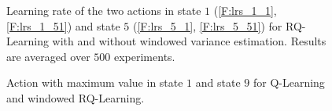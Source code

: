 \documentclass[conference]{IEEEtran}
\begin{document}
\begin{figure}[t]
\begin{minipage}{\textwidth}
\end{minipage}
\caption{Learning rate of the two actions in state $1$ (\ref{F:lrs_1_1}, \ref{F:lrs_1_51}) and state $5$ (\ref{F:lrs_5_1}, \ref{F:lrs_5_51}) for RQ-Learning with and without windowed variance estimation. Results are averaged over $500$ experiments.}
  \label{F:double_chain_lr}
\end{figure}

\begin{figure}[t]
\begin{minipage}{\textwidth}
\centering
\end{minipage}
\caption{Action with maximum value in state $1$ and state $9$ for Q-Learning and windowed RQ-Learning.}
  \label{F:max_a}
\end{figure}
\end{document}
